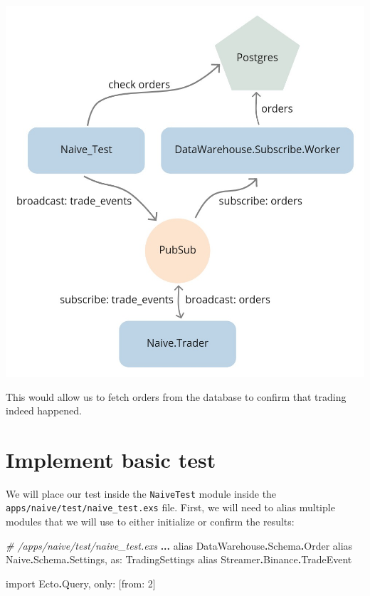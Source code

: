 \documentclass[
  oneside]{book}
\newenvironment{Shaded}{\begin{snugshade}}{\end{snugshade}}
\newcommand{\CommentTok}[1]{\textcolor[rgb]{0.56,0.35,0.01}{\textit{#1}}}
\newcommand{\ConstantTok}[1]{\textcolor[rgb]{0.56,0.35,0.01}{#1}}
\newcommand{\DecValTok}[1]{\textcolor[rgb]{0.00,0.00,0.81}{#1}}
\newcommand{\ImportTok}[1]{#1}
\newcommand{\NormalTok}[1]{#1}
\newcommand{\OperatorTok}[1]{\textcolor[rgb]{0.81,0.36,0.00}{\textbf{#1}}}
\newcommand{\OtherTok}[1]{\textcolor[rgb]{0.56,0.35,0.01}{#1}}
\newcommand{\VariableTok}[1]{\textcolor[rgb]{0.00,0.00,0.00}{#1}}
\begin{document}
\begin{center}\includegraphics[width=1\linewidth]{images/chapter_16_02_test} \end{center}

This would allow us to fetch orders from the database to confirm that trading indeed happened.

\section{Implement basic test}\label{implement-basic-test}

We will place our test inside the \texttt{NaiveTest} module inside the \texttt{apps/naive/test/naive\_test.exs} file.
First, we will need to alias multiple modules that we will use to either initialize or confirm the results:

\begin{Shaded}
\begin{Highlighting}[]
  \CommentTok{\# /apps/naive/test/naive\_test.exs}
  \OperatorTok{...}
  \ImportTok{alias} \ConstantTok{DataWarehouse}\OperatorTok{.}\ConstantTok{Schema}\OperatorTok{.}\ConstantTok{Order}
  \ImportTok{alias} \ConstantTok{Naive}\OperatorTok{.}\ConstantTok{Schema}\OperatorTok{.}\ConstantTok{Settings}\NormalTok{, }\VariableTok{as:} \ConstantTok{TradingSettings}
  \ImportTok{alias} \ConstantTok{Streamer}\OperatorTok{.}\ConstantTok{Binance}\OperatorTok{.}\ConstantTok{TradeEvent}

  \ImportTok{import} \ConstantTok{Ecto}\OperatorTok{.}\ConstantTok{Query}\NormalTok{, }\VariableTok{only:} \OtherTok{[}\VariableTok{from:} \DecValTok{2}\OtherTok{]}
\end{Highlighting}
\end{Shaded}
\end{document}
